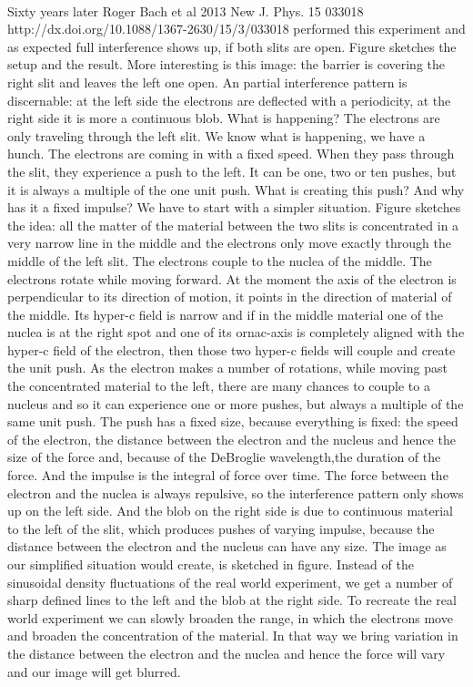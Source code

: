 \paragraph{}
Sixty years later Roger Bach et al 2013 New J. Phys. 15 033018
 http://dx.doi.org/10.1088/1367-2630/15/3/033018  
performed this experiment and as expected full interference shows up, if both slits are open. Figure sketches the setup and the result. More interesting is this image: the barrier is covering the right slit and leaves the left one open. An partial interference pattern is discernable: at the left side the electrons are deflected with a periodicity, at the right side it is more a continuous blob. What is happening? The electrons are only traveling through the left slit.
We know what is happening, we have a hunch. The electrons are coming in with a fixed speed. When they pass through the slit, they experience a push to the left. It can be one, two or ten pushes, but it is always a multiple of the one unit push. What is creating this push? And why has it a fixed impulse? We have to start with a simpler situation. Figure sketches the idea: all the matter of the material between the two slits is concentrated in a very narrow line in the middle and the electrons only move exactly through the middle of the left slit. The electrons couple to the nuclea of the middle. The electrons rotate while moving forward. At the moment the axis of the electron is perpendicular to its direction of motion, it points in the direction of material of the middle. Its hyper-c field is narrow and if in the middle material one of the nuclea is at the right spot and one of its ornac-axis is completely aligned with the hyper-c field of the electron, then those two hyper-c fields will couple and create the unit push. As the electron makes a number of rotations, while moving past the concentrated material to the left, there are many chances to couple to a nucleus and so it can experience one or more pushes, but always a multiple of the same unit push.
The push has a fixed size, because everything is fixed: the speed of the electron, the distance between the electron and the nucleus and hence the size of the force and, because of the DeBroglie wavelength,the duration of the force. And the impulse is the integral of force over time.
The force between the electron and the nuclea is always repulsive, so the interference pattern only shows up on the left side. And the blob on the right side is due to continuous material to the left of the slit, which produces pushes of varying impulse, because the distance between the electron and the nucleus can have any size. 
The image as our simplified situation would create, is sketched in figure. Instead of the sinusoidal density fluctuations of the real world experiment, we get a number of sharp defined lines to the left and the blob at the right side. To recreate the real world experiment we can slowly broaden the range, in which the electrons move and broaden the concentration of the material. In that way we bring variation in the distance between the electron and the nuclea and hence the force will vary and our image will get blurred.


